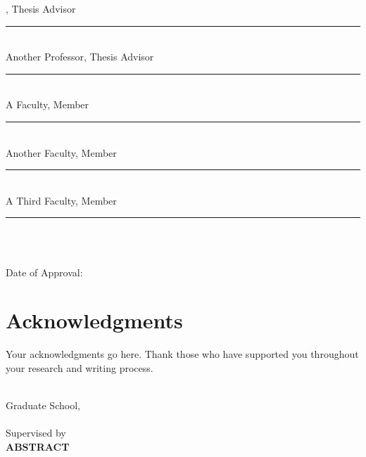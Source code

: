 \begin{flushright}	
\rightskip=1.1cm  %
\supervisor, Thesis Advisor 		\hspace{1.5cm}\rule{10em}{0.4pt}\\[1.1\baselineskip] 	
Another Professor, Thesis Advisor 	\hspace{1.5cm}\rule{10em}{0.4pt}\\[1.1\baselineskip] 	
A Faculty, Member 					\hspace{1.5cm}\rule{10em}{0.4pt}\\[1.1\baselineskip] 	
Another Faculty, Member 			\hspace{1.5cm}\rule{10em}{0.4pt}\\[1.1\baselineskip] 	
A Third Faculty, Member 			\hspace{1.5cm}\rule{10em}{0.4pt}\\[1.1\baselineskip]	
\end{flushright}

\vfill

\noindent

\begin{center} 
    \textbf{\university} \\ Date of Approval: \approvaldate
\end{center}

\newpage
\chapter*{Acknowledgments}

Your acknowledgments go here. Thank those who have supported you throughout your research and writing process.

\newpage
\cleardoublepage  %
\vspace*{0cm}  %
\begin{center}
    {\Large\bfseries \thesistitle\par}    
    {\large	\department\\ Graduate School, \university}\\[1\baselineskip]
    {\large {\bfseries \thesisauthor }\\[1\baselineskip] Supervised by \supervisor}\\[3\baselineskip]
    {\LARGE {\bfseries ABSTRACT }}
\end{center}

